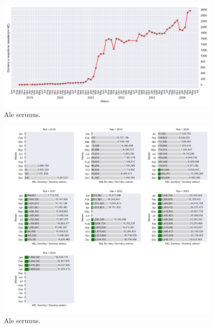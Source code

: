 \pagebreak


\begin{figure}[!htb]
\begin{center}
 \includegraphics[scale=0.59]{obrazky-figures/httparchive_nel_deployment_incorrect.pdf}
 \caption{\centering Ale seruuus.}
 \label{fig:httparchive-nel-deployment-incorrect}
\end{center}
\end{figure}

\pagebreak


\begin{figure}[!htb]
\begin{center}
 \includegraphics[scale=0.518]{obrazky-figures/httparchive_nel_deployment_ratio_values.pdf}
 \caption{\centering Ale seruuus.}
 \label{fig:httparchive-nel-deployment_ratio_values}
\end{center}
\end{figure}

